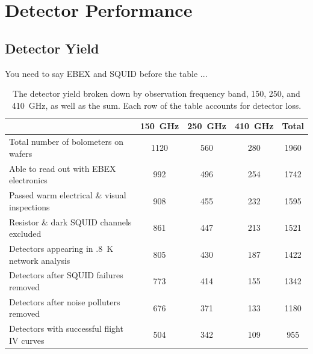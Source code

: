 \chapter{Detector Performance}
\label{detector_performance_chapter}

\section{Detector Yield}
\label{sec:yield}


You need to say \ac{EBEX} and \ac{SQUID} before the table ...

\begin{table}[ht!]
\begin{center}
\begin{tabular}{l|c|c|c|c}
  & 150~GHz & 250~GHz & 410~GHz & Total \\
\hline Total number of bolometers on wafers & 1120 & 560 & 280 & 1960 \\
\hline Able to read out with \ac{EBEX} electronics & 992 & 496 & 254 & 1742 \\
\hline Passed warm electrical \& visual inspections & 908 & 455 & 232 & 1595 \\
\hline Resistor \& dark \ac{SQUID} channels excluded & 861 & 447 & 213 & 1521 \\
\hline Detectors appearing in .8~K network analysis & 805 & 430 & 187 & 1422 \\
\hline Detectors after SQUID failures removed & 773 & 414 & 155 & 1342 \\
\hline Detectors after noise polluters removed & 676 & 371 & 133 & 1180 \\
\hline Detectors with successful flight IV curves & 504 & 342 & 109 & 955 \\
\hline
\end{tabular}
\end{center}
\caption{The detector yield broken down by observation frequency band, 150, 250, and 410~GHz, as well as the sum. Each row of the table accounts for detector loss.}
\label{yield_table}
\end{table}

